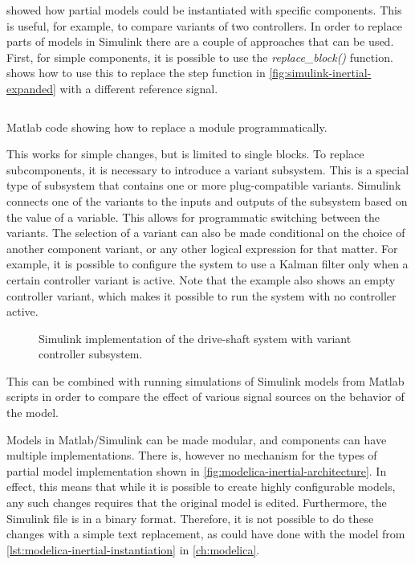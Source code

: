 \documentclass[\rootfolder/main.tex]{subfiles}
\begin{document}
 showed how partial models could be instantiated with specific components.
This is useful, for example, to compare variants of two controllers.
In order to replace parts of models in Simulink there are a couple of approaches that can be used.
First, for simple components, it is possible to use the \emph{replace\_block()} function.
 shows how to use this to replace the step function in \cref{fig:simulink-inertial-expanded} with a different reference signal.

\begin{listing}[ht]
    \inputminted{matlab}{\rootfolder/Models/Matlab/ReplaceSource.m}
    \caption{Matlab code showing how to replace a module programmatically.\label{lst:matlab-replace}}
\end{listing}

This works for simple changes, but is limited to single blocks.
To replace subcomponents, it is necessary to introduce a variant subsystem.
This is a special type of subsystem that contains one or more plug-compatible variants.
Simulink connects one of the variants to the inputs and outputs of the subsystem based on the value of a variable.
This allows for programmatic switching between the variants.
The selection of a variant can also be made conditional on the choice of another component variant, or any other logical expression for that matter.
For example, it is possible to configure the system to use a Kalman filter only when a certain controller variant is active.
Note that the example also shows an empty controller variant, which makes it possible to run the system with no controller active.

\begin{figure}[ht]
    \caption{Simulink implementation of the drive-shaft system with variant controller subsystem.\label{fig:simscape-inertial-blowup}}
\end{figure}

This can be combined with running simulations of Simulink models from Matlab scripts in order to compare the effect of various signal sources on the behavior of the model.

Models in Matlab/Simulink can be made modular, and components can have multiple implementations.
There is, however no mechanism for the types of partial model implementation shown in \cref{fig:modelica-inertial-architecture}.
In effect, this means that while it is possible to create highly configurable models, any such changes requires that the original model is edited.
Furthermore, the Simulink file is in a binary format.
Therefore, it is not possible to do these changes with a simple text replacement, as could have done with the model from \cref{lst:modelica-inertial-instantiation} in \cref{ch:modelica}.
\end{document}
